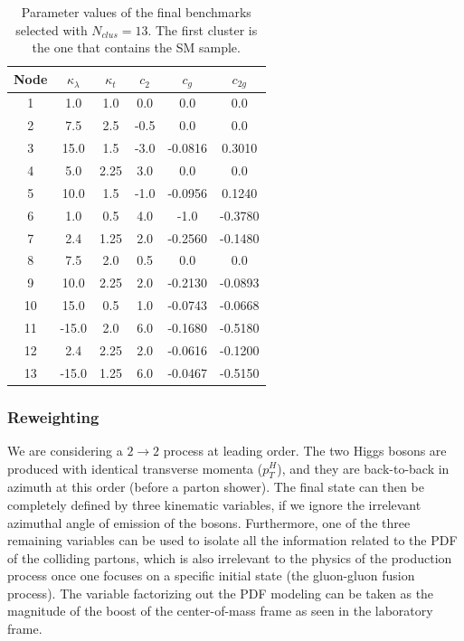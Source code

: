\begin{table}
\centering
\small{
\begin{tabular}{|c||c|c|c|c|c|}
\hline
Node & $\kappa_{\lambda}$ & $\kappa_{t}$ & $c_2$ & $c_g$ & $c_{2g}$ \\\hline
1  &   1.0 & 1.0  &  0.0 &  0.0 &  0.0  \\ \hline
2  &   7.5 & 2.5  & -0.5 &  0.0    &  0.0      \\ \hline
3  &  15.0 & 1.5  & -3.0 & -0.0816 &  0.3010   \\\hline
4  &   5.0 & 2.25 &  3.0 &  0.0    &  0.0     \\\hline
5  &  10.0 & 1.5  & -1.0 & -0.0956 &  0.1240  \\ \hline
6  &   1.0 & 0.5  &  4.0 & -1.0    & -0.3780  \\ \hline
7  &   2.4 & 1.25 &  2.0 & -0.2560 & -0.1480  \\ \hline
8  &   7.5 & 2.0  &  0.5 &  0.0    &  0.0     \\ \hline
9  &  10.0 & 2.25 &  2.0 & -0.2130 & -0.0893  \\ \hline
10 &  15.0 & 0.5  &  1.0 & -0.0743 & -0.0668  \\ \hline
11 & -15.0 & 2.0  &  6.0 & -0.1680 & -0.5180  \\ \hline
12 &   2.4 & 2.25 &  2.0 & -0.0616 & -0.1200   \\ \hline
13 & -15.0 & 1.25 &  6.0 & -0.0467 & -0.5150   \\ \hline
\end{tabular}
}
\caption{\small Parameter values of the final benchmarks selected with $N_{clus} = 13$. 
The first cluster is the one that contains the SM sample. 
\label{tab:bench_old}}
\end{table} 

\subsubsection{Reweighting}
\label{sec:rewei}

We are considering a $2\to 2$ process at leading order. The two Higgs bosons are produced with identical transverse momenta ($p_{T}^{H}$), and they are back-to-back in azimuth at this order (before a parton shower). The final state can then be completely defined by three kinematic variables, if we ignore the irrelevant azimuthal angle of emission of the bosons. Furthermore, one of the three remaining variables can be used to isolate all the information related to the PDF of the colliding partons, which is also irrelevant to the physics of the production process once one focuses on a specific initial state (the gluon-gluon fusion process). The variable factorizing out the PDF modeling can be taken as the magnitude of the boost of the center-of-mass frame as seen in the laboratory frame. 


